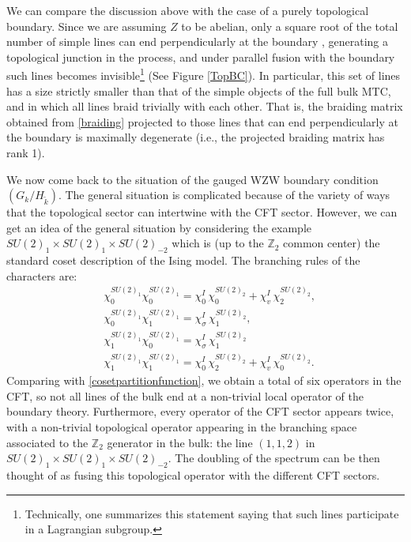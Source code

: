\documentclass[11pt]{article}
\numberwithin{equation}{section}
\begin{document}
We can compare the discussion above with the case of a purely topological boundary. Since we are assuming $Z$ to be abelian, only a square root of the total number of simple lines can end perpendicularly at the boundary \cite{Levin:2013gaa,Barkeshli_2013,Kapustin:2010hk,Fuchs:2012dt}, generating a topological junction in the process, and under parallel fusion with the boundary such lines becomes invisible\footnote{Technically, one summarizes this statement saying that such lines participate in a Lagrangian subgroup.} (See Figure \ref{TopBC}). In particular, this set of lines has a size strictly smaller than that of the simple objects of the full bulk MTC, and in which all lines braid trivially with each other. That is, the braiding matrix obtained from \eqref{braiding} projected to those lines that can end perpendicularly at the boundary is maximally degenerate (i.e., the projected braiding matrix has rank 1).



We now come back to the situation of the gauged WZW boundary condition $(G_{k}/H_{\tilde{k}})$. The general situation is complicated because of the variety of ways that the topological sector can intertwine with the CFT sector. However, we can get an idea of the general situation by considering the example $SU(2)_{1}\times SU(2)_{1}\times SU(2)_{-2}$ which is (up to the $\mathbb{Z}_{2}$ common center) the standard coset description of the Ising model. The branching rules of the characters are:
\begin{align}
    & \chi^{SU(2)_{1}}_{0} \chi^{SU(2)_{1}}_{0} = \chi^{I}_{0} \, \chi^{SU(2)_{2}}_{0} + \chi^{I}_{v} \, \chi^{SU(2)_{2}}_{2}, \\[0.3cm]
    & \chi^{SU(2)_{1}}_{0} \chi^{SU(2)_{1}}_{1} = \chi^{I}_{\sigma} \, \chi^{SU(2)_{2}}_{1}, \\[0.3cm]
    & \chi^{SU(2)_{1}}_{1} \chi^{SU(2)_{1}}_{0} = \chi^{I}_{\sigma} \, \chi^{SU(2)_{2}}_{1}  \\[0.3cm]
    & \chi^{SU(2)_{1}}_{1} \chi^{SU(2)_{1}}_{1} = \chi^{I}_{0} \, \chi^{SU(2)_{2}}_{2} + \chi^{I}_{v} \, \chi^{SU(2)_{2}}_{0}.
\end{align}
Comparing with \eqref{cosetpartitionfunction}, we obtain a total of six operators in the CFT, so not all lines of the bulk end at a non-trivial local operator of the boundary theory. Furthermore, every operator of the CFT sector appears twice, with a non-trivial topological operator appearing in the branching space associated to the $\mathbb{Z}_{2}$ generator in the bulk: the line $(1,1,2)$ in $SU(2)_{1} \times SU(2)_{1} \times SU(2)_{-2}$. The doubling of the spectrum can be then thought of as fusing this topological operator with the different CFT sectors.
\end{document}
